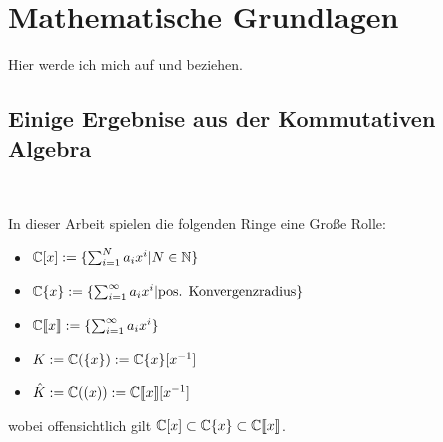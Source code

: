 \chapter{Mathematische Grundlagen}

Hier werde ich mich auf \cite{sabbah_cimpa90} und \cite{coutinho1995primer} beziehen.

\section{Einige Ergebnise aus der Kommutativen Algebra}~

In dieser Arbeit spielen die folgenden Ringe eine Große Rolle:
\begin{itemize}
  \item $\mathbb{C}[x]:=\{ \sum^{N}_{i=1}a_ix^i | N\in \mathbb{N} \}$
  \item $\mathbb{C}\{x\}:=\{ \sum^{\infty}_{i=1}a_ix^i | \mbox{pos.
        Konvergenzradius} \}$
  \item $\mathbb{C}\llbracket x\rrbracket:=\{ \sum^{\infty}_{i=1}a_ix^i \}$
  \item $K:=\mathbb{C}(\{x\}):=\mathbb{C}\{x\}[x^{-1}]$
  \item $\hat{K}:=\mathbb{C}((x)):=\mathbb{C}\llbracket x\rrbracket[x^{-1}]$
\end{itemize}

wobei offensichtlich gilt $\mathbb{C}[x]\subset\mathbb{C}\{x\}\subset\mathbb{C}\llbracket x\rrbracket$.

\begin{comment}
  \begin{lem}[Seite 2]
    ein paar eigenschaften
    \begin{enumerate}
      \item $\C[x]$ ist ein graduierter Ring, durch die Grad der
        Polynome. Diese graduierung induziert eine aufsteigende Filtrierung.

        alle Ideale haben die form $(x-a)$ mit $,a\in \C$
      \item wenn $\mathfrak{m}$ das maximale Ideal von $\C[x]$ (erzeugt von
        $x$ ist), so ist
        \[
          \C[[x]]=
          \underset{k}{\underleftarrow{\lim}} \C[X]\backslash\mathfrak{m}^k
        \]
        The ring $\C[[x]]$ ist ein nöterscher lokaler Ring:
        jede Potenzreihe mit konstantem term $\neq 0$ ist invertierbar.

        Der ring ist ebenfalls ein diskreter ??? Ring (discrete valuation
        ring)

        Die Filtrierung nach grad des Maximalen Ideals, genannt
        $\mathfrak{m}$-adische Fitration, ist die Filtrierung
        $\mathfrak{m}^k=\{f\in \C[[x]]|v(f)\geq k\}$

        und es gilt $gr_\mathfrak{m}(\C[[x]])=\C[x]$
      \item $\C\{x\}\subset \C[[x]]$ ist ein Untering der Potenzreihen, wobei
        der Konvergenzradius echt positiv ist.

        ist ähnlich zu $\C[[x]]$
    \end{enumerate}
  \end{lem}
\end{comment}

